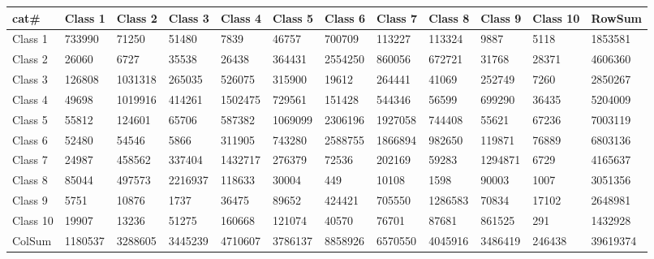 ﻿\begin{table}[!ht]
    \centering
    \begin{tabular}{|l|l|l|l|l|l|l|l|l|l|l|l|}
    \hline
        cat\# & Class 1 & Class 2 & Class 3 & Class 4 & Class 5 & Class 6 & Class 7 & Class 8 & Class 9 & Class 10 & RowSum \\ \hline
        Class 1 & 733990 & 71250 & 51480 & 7839 & 46757 & 700709 & 113227 & 113324 & 9887 & 5118 & 1853581 \\ \hline
        Class 2 & 26060 & 6727 & 35538 & 26438 & 364431 & 2554250 & 860056 & 672721 & 31768 & 28371 & 4606360 \\ \hline
        Class 3 & 126808 & 1031318 & 265035 & 526075 & 315900 & 19612 & 264441 & 41069 & 252749 & 7260 & 2850267 \\ \hline
        Class 4 & 49698 & 1019916 & 414261 & 1502475 & 729561 & 151428 & 544346 & 56599 & 699290 & 36435 & 5204009 \\ \hline
        Class 5 & 55812 & 124601 & 65706 & 587382 & 1069099 & 2306196 & 1927058 & 744408 & 55621 & 67236 & 7003119 \\ \hline
        Class 6 & 52480 & 54546 & 5866 & 311905 & 743280 & 2588755 & 1866894 & 982650 & 119871 & 76889 & 6803136 \\ \hline
        Class 7 & 24987 & 458562 & 337404 & 1432717 & 276379 & 72536 & 202169 & 59283 & 1294871 & 6729 & 4165637 \\ \hline
        Class 8 & 85044 & 497573 & 2216937 & 118633 & 30004 & 449 & 10108 & 1598 & 90003 & 1007 & 3051356 \\ \hline
        Class 9 & 5751 & 10876 & 1737 & 36475 & 89652 & 424421 & 705550 & 1286583 & 70834 & 17102 & 2648981 \\ \hline
        Class 10 & 19907 & 13236 & 51275 & 160668 & 121074 & 40570 & 76701 & 87681 & 861525 & 291 & 1432928 \\ \hline
        ColSum & 1180537 & 3288605 & 3445239 & 4710607 & 3786137 & 8858926 & 6570550 & 4045916 & 3486419 & 246438 & 39619374 \\ \hline
    \end{tabular}
\end{table}
